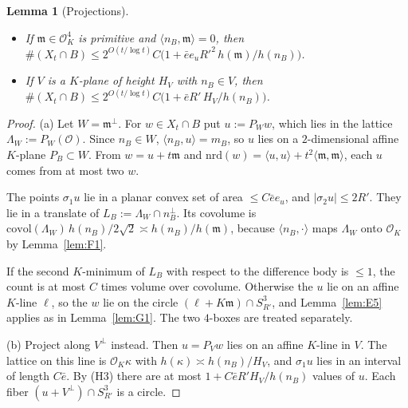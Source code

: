 \documentclass[aps,prx,twocolumn,superscriptaddress,nofootinbib,longbibliography]{revtex4-2}
\theoremstyle{plain}
\newtheorem{lemma}{Lemma}
\theoremstyle{definition}
\theoremstyle{remark}
\begin{document}
\begin{lemma}[Projections]\label{lem:G3}
\begin{itemize}\setlength\itemsep{0pt}
\item[(a)] If $\mathfrak m\in\mathcal O_K^4$ is primitive and $\langle n_B,\mathfrak m\rangle=0$, then
$\#(X_t\cap B)\le2^{O(t/\log t)}C\big(1+\bar ee_uR'^2\,h(\mathfrak m)/h(n_B)\big)$.
\item[(b)] If $V$ is a $K$-plane of height $H_V$ with $n_B\in V$, then
$\#(X_t\cap B)\le2^{O(t/\log t)}C\big(1+\bar eR'\,H_V/h(n_B)\big)$.
\end{itemize}
\end{lemma}
\begin{proof}
(a) Let $W=\mathfrak m^\perp$. For $w\in X_t\cap B$ put $u:=P_Ww$, which lies in the lattice
$\Lambda_W:=P_W(\mathcal O)$. Since $n_B\in W$, $\langle n_B,u\rangle=m_B$, so $u$ lies on a $2$-dimensional affine
$K$-plane $P_B\subset W$. From $w=u+t\mathfrak m$ and
$\mathrm{nrd}(w)=\langle u,u\rangle+t^2\langle\mathfrak m,\mathfrak m\rangle$, each $u$ comes from at most two $w$.

The points $\sigma_1u$ lie in a planar convex set of area $\le C\bar ee_u$, and $|\sigma_2u|\le2R'$. They lie in
a translate of $L_B:=\Lambda_W\cap n_B^\perp$. Its covolume is
$\mathrm{covol}(\Lambda_W)\,h(n_B)/2\sqrt2\asymp h(n_B)/h(\mathfrak m)$, because
$\langle n_B,\cdot\rangle$ maps $\Lambda_W$ onto $\mathcal O_K$ by Lemma~\ref{lem:F1}.

If the second $K$-minimum of $L_B$ with respect to the difference body is $\le1$, the count is at most $C$
times volume over covolume. Otherwise the $u$ lie on an affine $K$-line $\ell$, so the $w$ lie on the circle
$(\ell+K\mathfrak m)\cap S^3_{R'}$, and Lemma~\ref{lem:E5} applies as in Lemma~\ref{lem:G1}. The two
$4$-boxes are treated separately.

(b) Project along $V^\perp$ instead. Then $u=P_Vw$ lies on an affine $K$-line in $V$. The lattice on this
line is $\mathcal O_K\kappa$ with $h(\kappa)\asymp h(n_B)/H_V$, and $\sigma_1u$ lies in an interval of length
$C\bar e$. By (H3) there are at most $1+C\bar eR'H_V/h(n_B)$ values of $u$. Each fiber $(u+V^\perp)\cap S^3_{R'}$
is a circle.
\end{proof}
\end{document}
